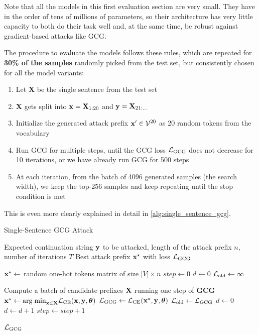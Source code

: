 \documentclass[../thesis.tex]{subfiles}
\begin{document}
Note that all the models in this first evaluation section are very small. They have in the order of tens of millions of parameters, so their architecture has very little capacity to both do their task well and, at the same time, be robust against gradient-based attacks like GCG.

The procedure to evaluate the models follows these rules, which are repeated for \textbf{30\% of the samples} randomly picked from the test set, but consistently chosen for all the model variants:
\begin{enumerate}
    \item Let $\mathbf{X}$ be the single sentence from the test set
    \item $\mathbf{X}$ gets split into $\mathbf{x} = \mathbf{X}_{1:20}$ and $\mathbf{y} = \mathbf{X}_{21:\dots}$
    \item Initialize the generated attack prefix $\mathbf{x}' \in \mathcal{V}^{20}$ as 20 random tokens from the vocabulary
    \item Run GCG for multiple steps, until the GCG loss $\mathcal{L}_\text{GCG}$ does not decrease for 10 iterations, or we have already run GCG for 500 steps
    \item At each iteration, from the batch of 4096 generated samples (the search width), we keep the top-256 samples and keep repeating until the stop condition is met
\end{enumerate}
This is even more clearly explained in detail in \cref{alg:single_sentence_gcg}.

\begin{algorithm}
    \caption{Single-Sentence GCG Attack}
    \label{alg:single_sentence_gcg}
    \begin{algorithmic}[1]
        \Require Expected continuation string $\mathbf{y}$ to be attacked,
                    length of the attack prefix $n$,
                    number of iterations $T$
        \Ensure Best attack prefix $\mathbf{x}^{\star}$ with loss $\mathcal{L}_\text{GCG}$
        
        \State $\mathbf{x}^{\star} \gets$ random one-hot tokens matrix of size $|V| \times n$
        \State $step \gets 0$                       
        \State $d \gets 0$                          
        \State $\mathcal{L}_{\text{old}} \gets \infty$    
        
            \State Compute a batch of candidate prefixes $\mathbf{X}$ running one step of \textbf{GCG}
            \State $\mathbf{x}^{\star} \gets \text{arg\;min}_{\mathbf{x} \in \mathbf{X}} \mathcal{L}_\text{CE}(\mathbf{x}, \mathbf{y}, \boldsymbol{\theta})$
            \State $\mathcal{L}_\text{GCG} \gets \mathcal{L}_\text{CE}(\mathbf{x}^{\star}, \mathbf{y}, \boldsymbol{\theta})$    
                \State $\mathcal{L}_{\text{old}} \gets \mathcal{L}_\text{GCG}$
                \State $d \gets 0$
            \Else
                \State $d \gets d + 1$
            \EndIf
            \State $step \gets step + 1$
        \EndWhile
        
        \State \Return $\mathcal{L}_\text{GCG}$
    \end{algorithmic}
\end{algorithm}
\end{document}
